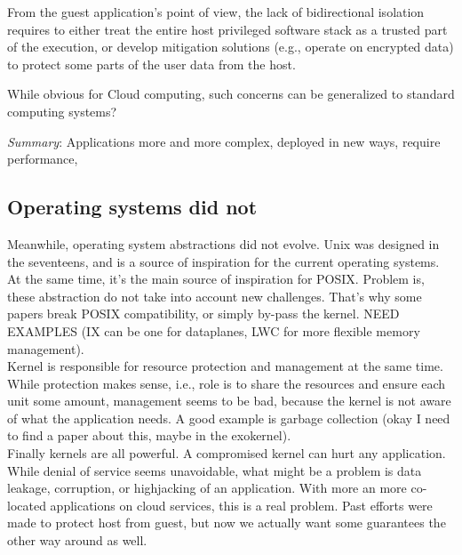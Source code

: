 From the guest application's point of view, the lack of bidirectional isolation requires to either treat the entire host privileged software stack as a trusted part of the execution, or develop mitigation solutions (e.g., operate on encrypted data) to protect some parts of the user data from the host.

While obvious for Cloud computing, such concerns can be generalized to standard computing systems?



\textit{Summary}: Applications more and more complex, deployed in new ways, require performance, 
\subsection{Operating systems did not}

Meanwhile, operating system abstractions did not evolve.
Unix was designed in the seventeens, and is a source of inspiration for the current operating systems.
At the same time, it's the main source of inspiration for POSIX.
Problem is, these abstraction do not take into account new challenges.
That's why some papers break POSIX compatibility, or simply by-pass the kernel.
NEED EXAMPLES (IX can be one for dataplanes, LWC for more flexible memory management).\\

Kernel is responsible for resource protection and management at the same time.
While protection makes sense, i.e., role is to share the resources and ensure each unit some amount,
management seems to be bad, because the kernel is not aware of what the application needs.
A good example is garbage collection (okay I need to find a paper about this, maybe in the exokernel).\\

Finally kernels are all powerful. A compromised kernel can hurt any application.
While denial of service seems unavoidable, what might be a problem is data leakage, corruption, or highjacking of an application.
With more an more co-located applications on cloud services, this is a real problem.
Past efforts were made to protect host from guest, but now we actually want some guarantees the other way around as well.\\

